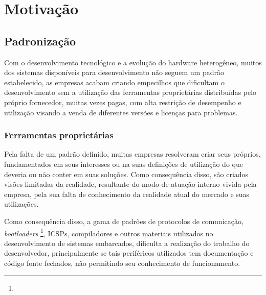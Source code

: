 \iffalse
O intuito deste trabalho é a realização de um sistema para possibilitar aos desenvolvedores a programação de sistemas embarcados, sem a necessidade de utilizar sistemas assistencialistas que possam limitar a evolução do trabalho ou a utilização do produto final concebido.
\fi

\section{Motivação}

\subsection{Padronização}
Com o desenvolvimento tecnológico e a evolução do hardware heterogêneo, muitos dos sistemas disponíveis para desenvolvimento não seguem um padrão estabelecido, as empresas acabam criando empecilhos que dificultam o desenvolvimento sem a utilização das ferramentas proprietárias distribuídas pelo próprio fornecedor, muitas vezes pagas, com alta restrição de desempenho e utilização visando a venda de diferentes versões e licenças para problemas.

\subsubsection{Ferramentas proprietárias}
Pela falta de um padrão definido, muitas empresas resolveram criar seus próprios, fundamentados em seus interesses ou na suas definições de utilização do que deveria ou não conter em suas soluções. Como consequência disso, são criados visões limitadas da realidade, resultante do modo de atuação interno vivida pela empresa, pela sua falta de conhecimento da realidade atual do mercado e suas utilizações.

Como consequência disso, a gama de padrões de protocolos de comunicação, \textit{bootloaders} \footnote{}, ICSPs, compiladores e outros materiais utilizados no desenvolvimento de sistemas embarcados, dificulta a realização do trabalho do desenvolvedor, principalmente se tais periféricos utilizados tem documentação e código fonte fechados, não permitindo seu conhecimento de funcionamento.



